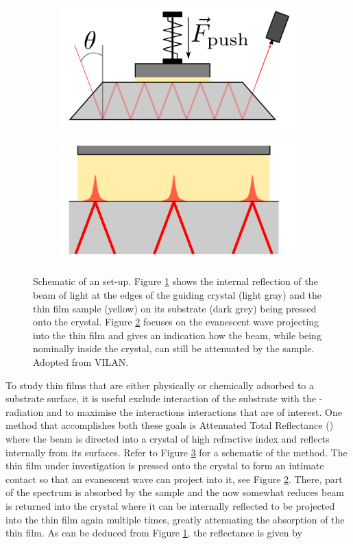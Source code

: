 \begin{figure}
\begin{subfigure}{0.5\textwidth}
\centering
	\includegraphics[width=0.8\linewidth]{./figs/IRoverview}
	\caption{}
	\label{fig:iroverview}
\end{subfigure}
\begin{subfigure}{0.5\textwidth}
\centering
	\includegraphics[width=0.8\linewidth]{./figs/IRwave}
	\caption{}
	\label{fig:irwave}
\end{subfigure}
\caption{Schematic of an \atr{} \ftir{} set-up. Figure \ref{fig:iroverview} shows the internal reflection of the beam of light at the edges of the guiding crystal (light gray) and the thin film sample (yellow) on its substrate (dark grey) being pressed onto the crystal. Figure \ref{fig:irwave} focuses on the evanescent wave projecting into the thin film and gives an indication how the beam, while being nominally inside the crystal, can still be attenuated by the sample. Adopted from VILAN.}
\label{fig:irscheme}
\end{figure}
To study thin films that are either physically or chemically adsorbed to a substrate surface, it is useful exclude interaction of the substrate with the \ir{}-radiation and to maximise the interactions interactions that are of interest. One method that accomplishes  both these goals is Attenuated Total Reflectance (\atr{}) \ftir{} where the \ir{} beam is directed into a crystal of high refractive index and reflects internally from its surfaces. Refer to Figure \ref{fig:irscheme} for a schematic of the \atr{} method. The thin film under investigation is pressed onto the crystal to form an intimate contact so that an evanescent \ir{} wave can project into it, see Figure \ref{fig:irwave}. There, part of the \ir{} spectrum is absorbed by the sample and the now somewhat reduces beam is returned into the crystal where it can be internally reflected to be projected into the thin film again multiple times, greatly attenuating the absorption of the thin film. As can be deduced from Figure \ref{fig:iroverview}, the reflectance is given by
